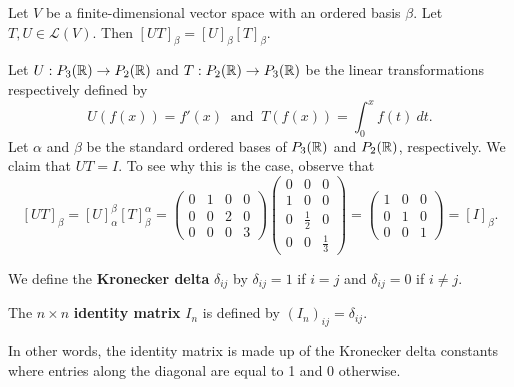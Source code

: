\begin{corollary}
    Let \( V  \) be a finite-dimensional vector space with an ordered basis \( \beta  \). Let \( T,U \in \mathcal{L}(V) \). Then \( [UT]_{\beta}^{}  = [U]_{\beta}^{}  [T]_{\beta}^{}  \).
\end{corollary}

\begin{eg}
    Let \( U: {P}_{3}(\mathbb{R}) \to {P}_{2}(\mathbb{R}) \) and \( T: {P}_{2}(\mathbb{R}) \to {P}_{3}(\mathbb{R}) \) be the linear transformations respectively defined by
    \[ U(f(x)) = f'(x)  \ \text{ and } \ T(f(x)) = \int_{ 0 }^{ x } f(t) \ dt.  \]
    Let \( \alpha  \) and \( \beta  \) be the standard ordered bases of \( {P}_{3}(\mathbb{R}) \) and \( {P}_{2}(\mathbb{R}) \), respectively. We claim that \( UT = I \). To see why this is the case, observe that
    \[ [UT]_{\beta}^{}  = [U]_{\alpha}^{\beta}  [T]_{\beta}^{\alpha} = \begin{pmatrix}
        0 & 1 & 0 & 0 \\
        0 & 0 & 2 & 0 \\
        0 & 0 & 0 & 3
        \end{pmatrix} \begin{pmatrix}
            0 & 0 & 0 \\
            1 & 0 & 0 \\
            0 & \frac{ 1 }{ 2 } & 0 \\
            0 & 0 & \frac{ 1 }{ 3 }  
            \end{pmatrix}  = \begin{pmatrix}
            1 & 0 & 0 \\
            0 & 1 & 0 \\
            0 & 0 & 1 
    \end{pmatrix} = [I]_{\beta}^{}.  \]
\end{eg}


\begin{definition}\label{Kronecker Delta}
    We define the \textbf{Kronecker delta} \( {\delta}_{ij} \) by \( {\delta}_{ij} = 1  \) if \( i = j  \) and \( {\delta}_{ij} = 0  \) if \( i \neq j  \). 
\end{definition}

\begin{definition}
   The \( n \times n  \) \textbf{identity matrix} \( {I}_{n} \) is defined by \( {({I}_{n})}_{ij} = {\delta}_{ij} \). 
\end{definition}

In other words, the identity matrix is made up of the Kronecker delta constants where entries along the diagonal are equal to 1 and 0 otherwise.

